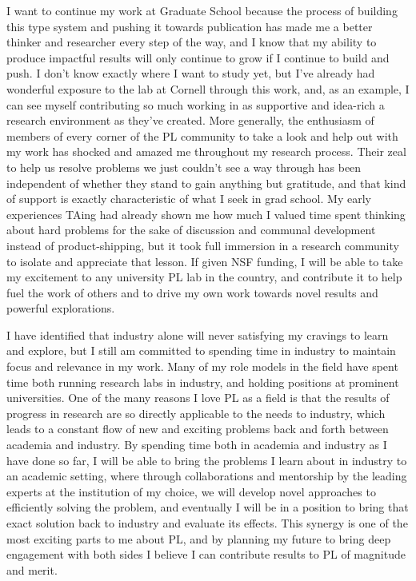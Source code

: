 \documentclass{nsf-grfp}
\begin{document}
I want to continue my work at Graduate School because the process of building this type system and pushing it towards publication has made me a better thinker and researcher every step of the way, and I know that my ability to produce impactful results will only continue to grow if I continue to build and push. I don't know exactly where I want to study yet, but I've already had wonderful exposure to the lab at Cornell through this work, and, as an example, I can see myself contributing so much working in as supportive and idea-rich a research environment as they've created. More generally, the enthusiasm of members of every corner of the PL community to take a look and help out with my work has shocked and amazed me throughout my research process. Their zeal to help us resolve problems we just couldn't see a way through has been independent of whether they stand to gain anything but gratitude, and that kind of support is exactly characteristic of what I seek in grad school. My early experiences TAing had already shown me how much I valued time spent thinking about hard problems for the sake of discussion and communal development instead of product-shipping, but it took full immersion in a research community to isolate and appreciate that lesson. If given NSF funding, I will be able to take my excitement to any university PL lab in the country, and contribute it to help fuel the work of others and to drive my own work towards novel results and powerful explorations. 

I have identified that industry alone will never satisfying my cravings to learn and explore, but I still am committed to spending time in industry to maintain focus and relevance in my work. Many of my role models in the field have spent time both running research labs in industry, and holding positions at prominent universities. One of the many reasons I love PL as a field is that the results of progress in research are so directly applicable to the needs to industry, which leads to a constant flow of new and exciting problems back and forth between academia and industry. By spending time both in academia and industry as I have done so far, I will be able to bring the problems I learn about in industry to an academic setting, where through collaborations and mentorship by the leading experts at the institution of my choice, we will develop novel approaches to efficiently solving the problem, and eventually I will be in a position to bring that exact solution back to industry and evaluate its effects. This synergy is one of the most exciting parts to me about PL, and by planning my future to bring deep engagement with both sides I believe I can contribute results to PL of magnitude and merit.
\end{document}
